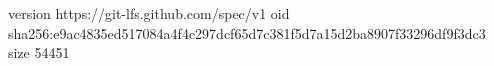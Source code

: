 version https://git-lfs.github.com/spec/v1
oid sha256:e9ac4835ed517084a4f4c297dcf65d7c381f5d7a15d2ba8907f33296df9f3dc3
size 54451
